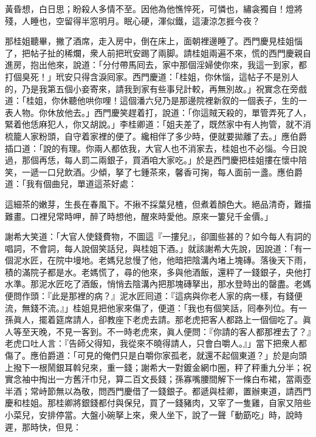\begin{myquote}[\markfont]
黃昏想，白日思；盼殺人多情不至。因他為他憔悴死，可憐也，繡衾獨自！燈將殘，人睡也，空留得半窓明月。眠心硬，渾似鐵，這淒涼怎捱今夜？

\end{myquote}

那桂姐聽畢，撇了酒席，走入房中，倒在床上，面朝裡邊睡了。{}西門慶見桂姐惱了，把帖子扯的稀爛，衆人前把玳安踢了兩脚。{}請桂姐兩遍不來，慌的西門慶親自進房，抱出他來，說道：「分付帶馬囘去，家中那個淫婦使你來，我這一到家，都打個臭死！」玳安只得含淚囘家。西門慶道：「桂姐，你休惱，這帖子不是別人的，乃是我第五個小妾寄來，請我到家有些事兒計較，再無別故。」祝實念在旁戲道：「桂姐，你休聽他哄你哩！這個潘六兒乃是那邊院裡新叙的一個表子，生的一表人物。你休放他去。」西門慶笑趕着打，說道：「你這賊天殺的，單管弄死了人，緊着他恁麻犯人，你又胡說。」{}李桂卿道：「姐夫差了，既然家中有人拘管，就不消梳籠人家粉頭，自守着家裡的便了。{}纔相伴了多少時，便就要拋離了去。」{}應伯爵插口道：「說的有理。你兩人都依我，大官人也不消家去，桂姐也不必惱。今日說過，那個再恁，每人罰二兩銀子，買酒咱大家吃。」於是西門慶把桂姐摟在懷中陪笑，一遞一口兒飲酒。少傾，拏了七鍾茶來，馨香可掬，每人面前一盞。應伯爵道：「我有個曲兒，單道這茶好處：

\begin{myquote}
這細茶的嫩芽，生長在春風下。不揪不採葉兒楂，但煮着顏色大。絕品清奇，難描難畫。口裡兒常時呷，醉了時想他，醒來時愛他。{}原來一簍兒千金價。」
\end{myquote}

謝希大笑道：「大官人使錢費物，不圖這『一摟兒』，{}卻圖些甚的？如今每人有詞的唱詞，不會詞，每人說個笑話兒，與桂姐下酒。」就該謝希大先說，因說道：「有一個泥水匠，在院中墁地。老媽兒怠慢了他，他暗把陰溝內堵上塊磚。落後天下雨，積的滿院子都是水。老媽慌了，尋的他來，多與他酒飯，還秤了一錢銀子，央他打水準。那泥水匠吃了酒飯，悄悄去陰溝內把那塊磚拏出，那水登時出的罄盡。老媽便問作頭：『此是那裡的病？』泥水匠囘道：『這病與你老人家的病一樣，有錢便流，無錢不流。』」桂姐見把他家來傷了，便道：「我也有個笑話，囘奉列位。有一孫眞人，擺着筵席請人，卻教座下老虎去請。那老虎把客人都路上一個個吃了。眞人等至天晚，不見一客到。不一時老虎來，眞人便問：『你請的客人都那裡去了？』老虎口吐人言：{}『告師父得知，我從來不曉得請人，只會白嚼人。』」當下把衆人都傷了。應伯爵道：「可見的俺們只是白嚼你家孤老，就還不起個東道？」於是向頭上撥下一根鬧銀耳斡兒來，重一錢；謝希大一對鍍金網巾圈，秤了秤重九分半；祝實念袖中掏出一方舊汗巾兒，算二百文長錢；{}孫寡嘴腰間解下一條白布裙，{}當兩壺半酒；常峙節無以為敬，問西門慶借了一錢銀子。都遞與桂卿，置辦東道，請西門慶和桂姐。那桂卿將銀錢都付與保兒，買了一錢豬肉，又宰了一隻雞，自家又陪些小菜兒，{}安排停當。大盤小碗拏上來，衆人坐下，說了一聲「動筯吃」時，說時遲，那時快，但見：

